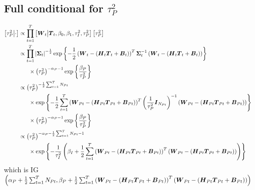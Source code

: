 \documentclass{article}\usepackage[]{graphicx}\usepackage[]{color}
\def\bm#1{\mbox{\boldmath $#1$}}
\begin{document}
\subsection{Full conditional for $\tau^2_P$}
%
\begin{align*}
%
\left[ \tau^2_P \middle| \cdot \right] & \propto \prod_{t = 1}^T \left[ \bm{W}_t \middle| \bm{T}_t, \beta_0, \beta_1, \tau^2_I, \tau^2_P \right] \left[ \tau^2_P \right] \\
%
& \propto \prod_{t = 1}^T \left| \bm{\Sigma}_t \right|^{ - \frac{1} {2}} \exp{ \left\{ - \frac{1} {2} \left( \bm{W}_t - \left( \bm{H}_t \bm{T}_t + \bm{B}_t \right) \right)^T \bm{\Sigma}_t^{ - 1} \left( \bm{W}_t - \left( \bm{H}_t \bm{T}_t + \bm{B}_t \right) \right) \right\} }\\
& \hspace{6mm} \times \left( \tau^2_P \right)^{ - \alpha_P - 1 } \exp{ \left\{ \frac{\beta_P} {\tau^2_P} \right\} }\\
%
& \propto \left( \tau^2_P \right)^{ - \frac{1} {2} \sum_{t = 1}^T N_{Pt}}\\
& \hspace{6mm} \times \exp{ \left\{ - \frac{1} {2} \sum_{t = 1}^T \left( \bm{W}_{Pt} - \left( \bm{H}_{Pt} \bm{T}_{Pt} + \bm{B}_{Pt} \right) \right)^T \left( \frac{1} {\tau^2_P} \bm{I}_{N_{Pt}} \right)^{ - 1} \left( \bm{W}_{Pt} - \left( \bm{H}_{Pt} \bm{T}_{Pt} + \bm{B}_{Pt} \right) \right) \right\} }\\
& \hspace{6mm} \times \left( \tau^2_P \right)^{ - \alpha_P - 1 } \exp{ \left\{ \frac{\beta_P} {\tau^2_P} \right\} }\\
%
& \propto \left( \tau^2_P \right)^{ - \alpha_P - \frac{1} {2} \sum_{t = 1}^T N_{Pt} - 1 }\\
& \hspace{6mm} \times \exp{ \left\{ - \frac{1} {\tau^2_I} \left( \beta_I + \frac{1} {2} \sum_{t = 1}^T \left( \bm{W}_{Pt} - \left( \bm{H}_{Pt} \bm{T}_{Pt} + \bm{B}_{Pt} \right) \right)^T \left( \bm{W}_{Pt} - \left( \bm{H}_{Pt} \bm{T}_{Pt}  + \bm{B}_{Pt} \right) \right) \right) \right\} }\\
%
\end{align*}
%
which is IG$\left( \alpha_P + \frac{1} {2} \sum_{t = 1}^T N_{Pt}, \beta_P + \frac{1} {2} \sum_{t = 1}^T \left( \bm{W}_{Pt} - \left( \bm{H}_{Pt} \bm{T}_{Pt}  + \bm{B}_{Pt} \right) \right)^T \left( \bm{W}_{Pt} - \left( \bm{H}_{Pt} \bm{T}_{Pt}  + \bm{B}_{Pt} \right) \right) \right)$
%
%
\end{document}
